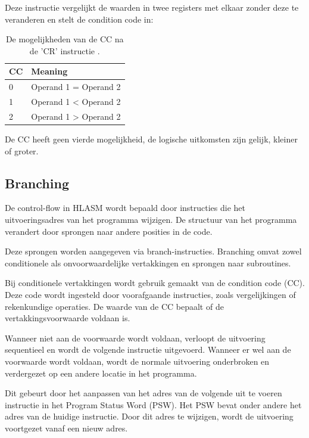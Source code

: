 Deze instructie vergelijkt de waarden in twee registers met elkaar zonder deze te veranderen en stelt de condition code in:

\begin{table}[h!]
    \centering
    \small
    \begin{tabular}{|p{3cm}|p{7cm}|}
        \hline
        \textbf{CC} & \textbf{Meaning} \\
        \hline
        0 & Operand 1 = Operand 2 \\
        \hline
        1 & Operand 1 < Operand 2 \\
        \hline
        2 & Operand 1 > Operand 2 \\
        \hline
    \end{tabular}
    \caption{De mogelijkheden van de CC na de 'CR' instructie \autocite{ehrman_2001}.}
    \label{tab:ccCR}
\end{table}

De CC heeft geen vierde mogelijkheid, de logische uitkomsten zijn gelijk, kleiner of groter. 

\subsection{Branching}

De control-flow in HLASM wordt bepaald door instructies die het uitvoeringsadres van het programma wijzigen. De structuur van het programma verandert door sprongen naar andere posities in de code.

Deze sprongen worden aangegeven via branch-instructies. Branching omvat zowel conditionele als onvoorwaardelijke vertakkingen en sprongen naar subroutines.

Bij conditionele vertakkingen wordt gebruik gemaakt van de condition code (CC). Deze code wordt ingesteld door voorafgaande instructies, zoals vergelijkingen of rekenkundige operaties. De waarde van de CC bepaalt of de vertakkingsvoorwaarde voldaan is.

Wanneer niet aan de voorwaarde wordt voldaan, verloopt de uitvoering sequentieel en wordt de volgende instructie uitgevoerd. Wanneer er wel aan de voorwaarde wordt voldaan, wordt de normale uitvoering onderbroken en verdergezet op een andere locatie in het programma.

Dit gebeurt door het aanpassen van het adres van de volgende uit te voeren instructie in het Program Status Word (PSW). Het PSW bevat onder andere het adres van de huidige instructie. Door dit adres te wijzigen, wordt de uitvoering voortgezet vanaf een nieuw adres.

